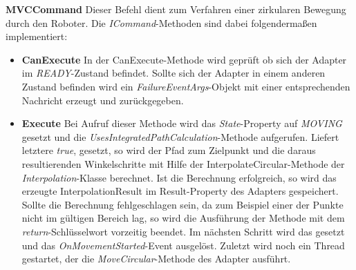 \textbf{MVCCommand}
\newline
Dieser Befehl dient zum Verfahren einer zirkularen Bewegung durch den Roboter. Die \textit{ICommand}-Methoden sind dabei folgendermaßen implementiert:
\begin{itemize}
\item \textbf{CanExecute}
\newline
In der CanExecute-Methode wird geprüft ob sich der Adapter im \textit{READY}-Zustand befindet. Sollte sich der Adapter in einem anderen Zustand befinden wird ein \textit{FailureEventArgs}-Objekt mit einer entsprechenden Nachricht erzeugt und zurückgegeben.
\item \textbf{Execute}
\newline
Bei Aufruf dieser Methode wird das \textit{State}-Property auf \textit{MOVING} gesetzt und die \textit{UsesIntegratedPathCalculation}-Methode aufgerufen. Liefert letztere \textit{true}, gesetzt, so wird der Pfad zum Zielpunkt und die daraus resultierenden Winkelschritte mit Hilfe der InterpolateCircular-Methode der \textit{Interpolation}-Klasse berechnet. Ist die Berechnung erfolgreich, so wird das erzeugte InterpolationResult im Result-Property des Adapters gespeichert. Sollte die Berechnung fehlgeschlagen sein, da zum Beispiel einer der Punkte nicht im gültigen Bereich lag, so wird die Ausführung der Methode mit dem \textit{return}-Schlüsselwort vorzeitig beendet. Im nächsten Schritt wird das  gesetzt und das \textit{OnMovementStarted}-Event ausgelöst. Zuletzt wird noch ein Thread gestartet, der die \textit{MoveCircular}-Methode des Adapter ausführt.
\end{itemize}

